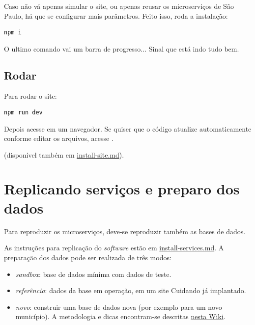 \documentclass[letterpaper,10pt,english]{sphinxmanual}
\begin{document}
Caso não vá apenas simular o site, ou apenas reusar os microserviços de
São Paulo, há que se configurar mais parâmetros. Feito isso, roda a
instalação:

\begin{Verbatim}[commandchars=\\\{\}]
npm i
\end{Verbatim}

O ultimo comando vai um barra de progresso... Sinal que está indo tudo
bem.


\subsection{Rodar}
\label{install-site:rodar}
Para rodar o site:

\begin{Verbatim}[commandchars=\\\{\}]
npm run dev
\end{Verbatim}

Depois acesse  em um navegador. Se quiser que o código
atualize automaticamente conforme editar os arquivos, acesse
.

(disponível também em \href{https://github.com/okfn-brasil/cuidando2-doc/blob/master/install-services.md}{install-site.md}).


\section{Replicando serviços e preparo dos dados}
\label{index:replicando-servicos-e-preparo-dos-dados}
Para reproduzir os microserviços, deve-se reproduzir também as bases de
dados.

As instruções para replicação do \emph{software} estão em
\href{https://github.com/okfn-brasil/cuidando2-doc/blob/master/install-services.md}{install-services.md}. A preparação dos dados
pode ser realizada de três modos:
\begin{itemize}
\item {} 
\emph{sandbox}: base de dados mínima com dados de teste.

\item {} 
\emph{referência}: dados da base em operação, em um site Cuidando já
implantado.

\item {} 
\emph{novo}: construir uma base de dados nova (por exemplo para um novo
município). A metodologia e dicas encontram-se descritas \href{https://pt.wikiversity.org/wiki/Projeto\_Cuidando\_do\_Meu\_Bairro/Novos\_dados}{nesta
Wiki}.

\end{itemize}
\end{document}
